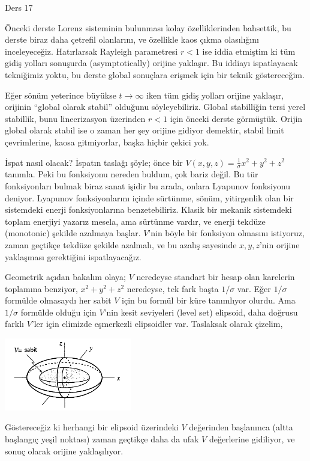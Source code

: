 \documentclass[12pt,fleqn]{article}\usepackage{../../common}
\begin{document}
Ders 17

Önceki derste Lorenz sisteminin bulunması kolay özelliklerinden bahsettik,
bu derste biraz daha çetrefil olanlarını, ve özellikle kaos çıkma
olasılığını inceleyeceğiz. Hatırlarsak Rayleigh parametresi $r < 1$ ise
iddia etmiştim ki tüm gidiş yolları sonuşurda (asymptotically) orijine
yaklaşır. Bu iddiayı ispatlayacak tekniğimiz yoktu, bu derste global
sonuçlara erişmek için bir teknik göstereceğim.

Eğer sönüm yeterince büyükse $t \to \infty$ iken tüm gidiş yolları
orijine yaklaşır, orijinin ``global olarak stabil'' olduğunu
söyleyebiliriz. Global stabilliğin tersi yerel stabillik, bunu
lineerizasyon üzerinden $r < 1$ için önceki derste görmüştük. Orijin global
olarak stabil ise o zaman her şey orijine gidiyor demektir, stabil limit
çevrimlerine, kaosa gitmiyorlar, başka hiçbir çekici yok. 

İspat nasıl olacak? İspatın taslağı şöyle; önce bir
$V(x,y,z) = \frac{1}{\sigma} x^2 + y^2 + z^2$ tanımla. Peki bu fonksiyonu
nereden buldum, çok bariz değil. Bu tür fonksiyonları bulmak biraz sanat
işidir bu arada, onlara Lyapunov fonksiyonu deniyor. Lyapunov
fonksiyonlarını içinde sürtünme, sönüm, yitirgenlik olan bir sistemdeki
enerji fonksiyonlarına benzetebiliriz. Klasik bir mekanik sistemdeki toplam
enerjiyi yazarız mesela, ama sürtünme vardır, ve enerji tekdüze (monotonic)
şekilde azalmaya başlar. $V$'nin böyle bir fonksiyon olmasını istiyoruz,
zaman geçtikçe tekdüze şekilde azalmalı, ve bu azalış sayesinde $x,y,z$'nin
orijine yaklaşması gerektiğini ispatlayacağız.

Geometrik açıdan bakalım olaya; $V$ neredeyse standart bir hesap olan
karelerin toplamına benziyor, $ x^2 + y^2 + z^2$ neredeyse, tek fark başta
$1/\sigma$ var. Eğer $1/\sigma$ formülde olmasaydı her sabit $V$ için bu
formül bir küre tanımlıyor olurdu. Ama $1/\sigma$ formülde olduğu için
$V$'nin kesit seviyeleri (level set) elipsoid, daha doğrusu farklı $V$'ler
için elimizde eşmerkezli elipsoidler var. Taslaksak olarak çizelim,

\includegraphics[width=15em]{17_02.png}

Göstereceğiz ki herhangi bir elipsoid üzerindeki $V$ değerinden başlanınca
(altta başlangıç yeşil noktası) zaman geçtikçe daha da ufak $V$ değerlerine
gidiliyor, ve sonuç olarak orijine yaklaşılıyor. 
\end{document}
